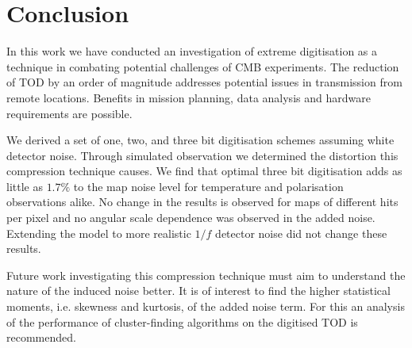 \documentclass[apj]{emulateapj}
\begin{document}

\section{Conclusion}
\label{sec:conclusions}

In this work we have conducted an investigation of extreme digitisation as a technique in combating potential challenges of CMB experiments. The reduction of TOD by an order of magnitude addresses potential issues in transmission from remote locations. Benefits in mission planning, data analysis and hardware requirements are possible.

We derived a set of one, two, and three bit digitisation schemes assuming white detector noise. Through simulated observation we determined the distortion this compression technique causes. We find that optimal three bit digitisation adds as little as $1.7\%$ to the map noise level for temperature and polarisation observations alike. No change in the results is observed for maps of different hits per pixel and no angular scale dependence was observed in the added noise. Extending the model to more realistic $1/f$ detector noise did not change these results.


Future work investigating this compression technique must aim to understand the nature of the induced noise better. It is of interest to find the higher statistical moments, i.e. skewness and kurtosis, of the added noise term. For this an analysis of the performance of cluster-finding algorithms on the digitised TOD is recommended.

\acknowledgments %
\end{document}
